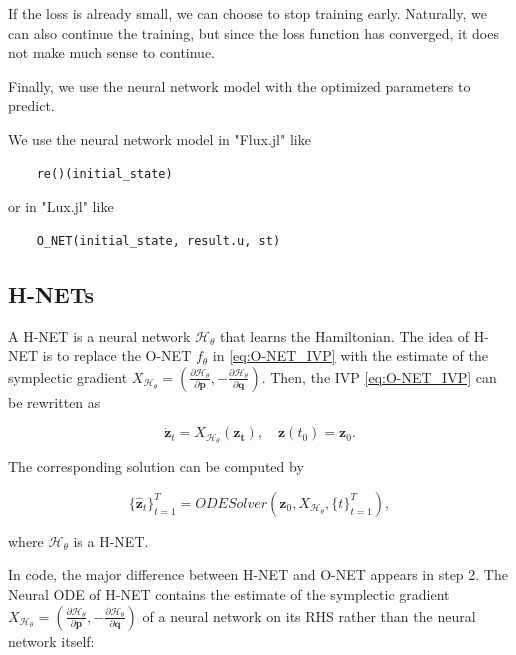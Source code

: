 \documentclass[
	parskip, 			   %
	twoside, 			   %
	DIV=14, 			   %
	BCOR=15.0mm, 		   %
	headsepline, 		   %
	open=right, 		   %
	captions=tableheading, %
	bibliography=totoc,    %
	numbers=noenddot       %
]{scrreprt}
\begin{document}
If the loss is already small, we can choose to stop training early. Naturally, we can also continue the training, but since the loss function has converged, it does not make much sense to continue.

Finally, we use the neural network model with the optimized parameters to predict.

We use the neural network model in "Flux.jl" like
\begin{verbatim}
    re()(initial_state)
\end{verbatim}

or in "Lux.jl" like
\begin{verbatim}
    O_NET(initial_state, result.u, st)
\end{verbatim}


\subsection{H-NETs}
A H-NET is a neural network $\mathcal{H}_{\theta}$ that learns the Hamiltonian. The idea of H-NET is to replace the O-NET $f_{\theta}$ in \ref{eq:O-NET_IVP} with the estimate of the symplectic gradient $X_{\mathcal{H}_{\theta}}=(\frac{\partial \mathcal{H}_{\theta}}{\partial \mathbf{p}}, - \frac{\partial \mathcal{H}_{\theta}}{\partial \mathbf{q}})$. Then, the IVP \ref{eq:O-NET_IVP} can be rewritten as

\begin{equation}
    \label{eq:H-NET_IVP}
    \dot{\mathbf{z}}_t = X_{\mathcal{H}_{\theta}}(\mathbf{z_t}), \quad \mathbf{z}(t_{0}) = \mathbf{z}_{0}.
\end{equation}

The corresponding solution can be computed by

\begin{equation}
    \label{eq:H-NET_ODESolver}
     \{ \mathbf{\hat{z}}_{t} \}_{t=1}^{T}  = ODESolver(\mathbf{z}_{0}, X_{\mathcal{H}_{\theta}}, \{ t \}_{t=1}^{T}),
\end{equation}

where $\mathcal{H}_{\theta}$ is a H-NET.

In code, the major difference between H-NET and O-NET appears in step 2. The Neural ODE of H-NET contains the estimate of the symplectic gradient $X_{\mathcal{H}_{\theta}}=(\frac{\partial \mathcal{H}_{\theta}}{\partial \mathbf{p}}, - \frac{\partial \mathcal{H}_{\theta}}{\partial \mathbf{q}})$ of a neural network on its RHS rather than the neural network itself:
\end{document}
